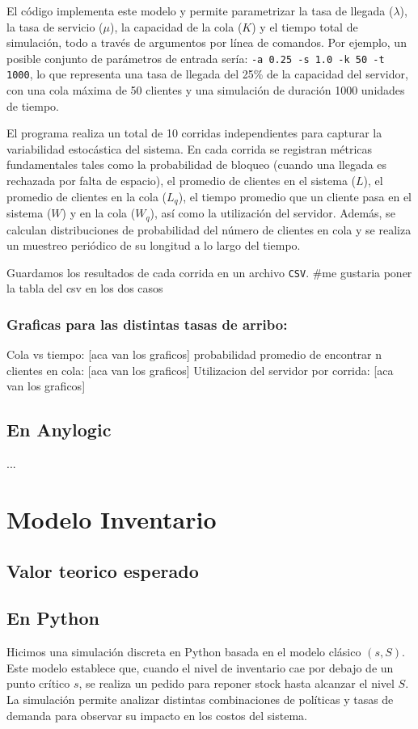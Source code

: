 \documentclass{article}
\begin{document}
El código implementa este modelo y permite parametrizar la tasa de llegada (\( \lambda \)), la tasa de servicio (\( \mu \)), la capacidad de la cola (\( K \)) y el tiempo total de simulación, todo a través de argumentos por línea de comandos. Por ejemplo, un posible conjunto de parámetros de entrada sería: \texttt{-a 0.25 -s 1.0 -k 50 -t 1000}, lo que representa una tasa de llegada del 25\% de la capacidad del servidor, con una cola máxima de 50 clientes y una simulación de duración 1000 unidades de tiempo.

El programa realiza un total de 10 corridas independientes para capturar la variabilidad estocástica del sistema. En cada corrida se registran métricas fundamentales tales como la probabilidad de bloqueo (cuando una llegada es rechazada por falta de espacio), el promedio de clientes en el sistema (\( L \)), el promedio de clientes en la cola (\( L_q \)), el tiempo promedio que un cliente pasa en el sistema (\( W \)) y en la cola (\( W_q \)), así como la utilización del servidor. Además, se calculan distribuciones de probabilidad del número de clientes en cola y se realiza un muestreo periódico de su longitud a lo largo del tiempo.

Guardamos los resultados de cada corrida en un archivo \texttt{CSV}.
#me gustaria poner la tabla del csv en los dos casos

\subsubsection{Graficas para las distintas tasas de arribo:}
Cola vs tiempo:
[aca van los graficos]
probabilidad promedio de encontrar n clientes en cola:
[aca van los graficos]
Utilizacion del servidor por corrida:
[aca van los graficos]

\subsection{En Anylogic}
...

\section{Modelo Inventario}

\subsection{Valor teorico esperado}

\subsection{En Python}
Hicimos una simulación discreta en Python basada en el modelo clásico \((s, S)\). Este modelo establece que, cuando el nivel de inventario cae por debajo de un punto crítico \( s \), se realiza un pedido para reponer stock hasta alcanzar el nivel \( S \). La simulación permite analizar distintas combinaciones de políticas y tasas de demanda para observar su impacto en los costos del sistema.
\end{document}
